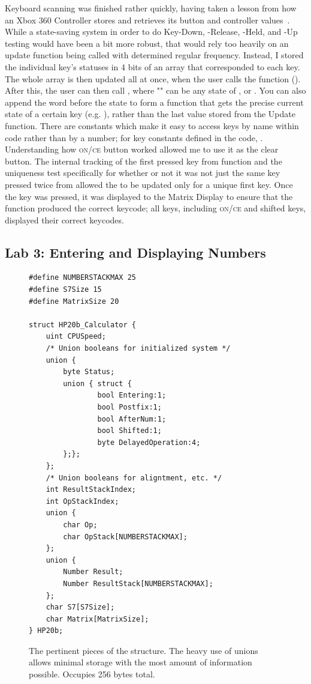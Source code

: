 \documentclass{LibHP20b}
\begin{document}
Keyboard scanning was finished rather quickly, having taken a lesson from how an Xbox 360 Controller stores and retrieves its button and controller values~\cite{xbox360}.
While a state-saving system in order to do Key-Down, -Release, -Held, and -Up testing would have been a bit more robust, that would rely too heavily on an update function being called with determined regular frequency. Instead, I stored the individual key's statuses in 4 bits of an array that corresponded to each key. The whole array is then updated all at once, when the user calls the  function (). After this, the user can then call , where "" can be any state of , or . You can also append the word  before the state to form a function that gets the precise current state of a certain key (e.g. ), rather than the last value stored from the Update function. There are constants which make it easy to access keys by name within code rather than by a number; for key constants defined in the code, .\\

Understanding how \textsc{on/ce} button worked allowed me to use it as the clear button. The internal tracking of the first pressed key from function  and the uniqueness test specifically for whether or not it was not just the same key pressed twice from  allowed the \LCD{} to be updated only for a unique first key. Once the key was pressed, it was displayed to the Matrix Display to ensure that the function  produced the correct keycode; all keys, including \textsc{on/ce} and shifted keys, displayed their correct keycodes.

\subsection{Lab 3: Entering and Displaying Numbers}
\label{sec:entering}

\begin{figure}
\begin{lstlisting}
#define NUMBERSTACKMAX 25
#define S7Size 15
#define MatrixSize 20

struct HP20b_Calculator {
	uint CPUSpeed;
	/* Union booleans for initialized system */
	union {
		byte Status;
		union { struct {
				bool Entering:1;
				bool Postfix:1;
				bool AfterNum:1;
				bool Shifted:1;
				byte DelayedOperation:4;
		};};
	};
	/* Union booleans for aligntment, etc. */
	int ResultStackIndex;
	int OpStackIndex;
	union {
		char Op;
		char OpStack[NUMBERSTACKMAX];
	};
	union {
		Number Result;
		Number ResultStack[NUMBERSTACKMAX];
	};
	char S7[S7Size];
	char Matrix[MatrixSize];
} HP20b;
\end{lstlisting}
\label{fig:hp20bstruct}
\caption{The pertinent pieces of the \HP[hp] structure. The heavy use of unions allows minimal storage with the most amount of information possible. Occupies 256 bytes total.}
\end{figure}
\end{document}

